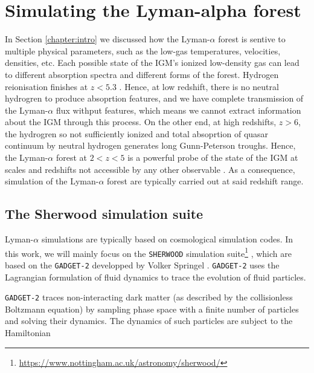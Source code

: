 \chapter{Simulating the Lyman-alpha forest} \label{chap:sherwood}
In Section \ref{chapter:intro} we discussed how the Lyman-$\alpha$ forest is sentive to multiple physical parameters, such as the low-gas temperatures, velocities, densities, etc. Each possible state of the IGM's ionized low-density gas can lead to different absorption spectra and different forms of the forest. Hydrogen reionisation finishes at $z<5.3$ \cite{Bosman_2022}. Hence, at low redshift, there is no neutral hydrogren to produce absoprtion features, and we have complete transmission of the Lyman-$\alpha$ flux withput features, which means we cannot extract information about the IGM through this process. On the other end, at high redshifts, $z>6$, the hydrogren so not sufficiently ionized and total absoprtion of quasar continuum by neutral hydrogen generates long Gunn-Peterson troughs.
Hence, the Lyman-$\alpha$ forest at $2<z<5$ is a powerful probe of the state of the IGM at scales and redshifts not accessible by any other observable \cite{Hernquist__1996}. As a consequence, simulation of the Lyman-$\alpha$ forest are typically carried out at said redshift range.














\section{The Sherwood simulation suite}\label{sec:sherwood suite}
Lyman-$\alpha$ simulations are typically based on cosmological simulation codes.
In this work, we will mainly focus on the \texttt{SHERWOOD} simulation suite\footnote{\url{https://www.nottingham.ac.uk/astronomy/sherwood/}} \cite{Bolton_2016}, which are based on the \texttt{GADGET-2} developped by Volker Springel \cite{Springel_2005}. \texttt{GADGET-2} uses the Lagrangian formulation of fluid dynamics to trace the evolution of fluid particles.


\texttt{GADGET-2} traces non-interacting dark matter (as described by the collisionless Boltzmann equation) by sampling phase space with a finite number of particles and solving their dynamics. The dynamics of such particles are subject to the Hamiltonian

